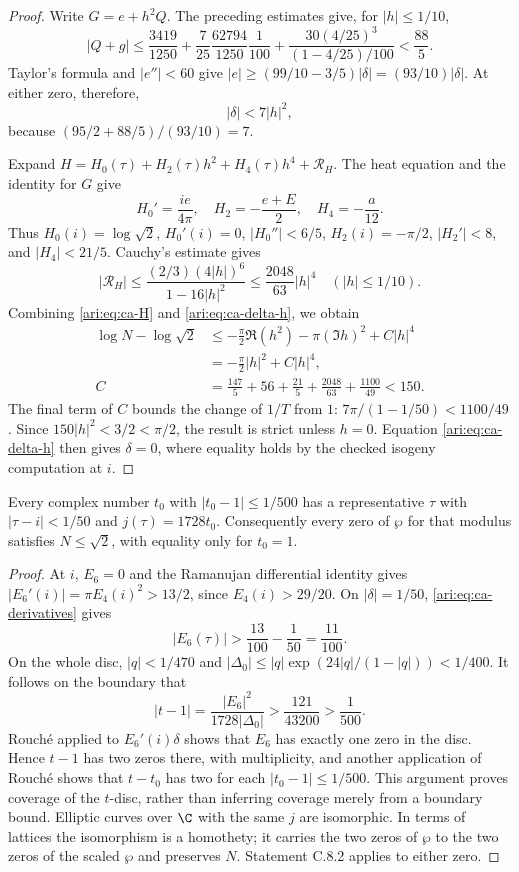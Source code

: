 \begin{proof}
Write $G=e+h^2Q$. The preceding estimates give, for $|h|\le1/10$,
\[
 |Q+g|\le
 \frac{3419}{1250}+\frac7{25}\frac{62794}{1250}\frac1{100}
       +\frac{30(4/25)^3}{(1-4/25)/100}<\frac{88}{5}.
\]
Taylor's formula and $|e''|<60$ give
$|e|\ge(99/10-3/5)|\delta|=(93/10)|\delta|$.
At either zero, therefore,
\begin{equation}\label{ari:eq:ca-delta-h}
 |\delta|<7|h|^2,
\end{equation}
because $(95/2+88/5)/(93/10)=7$.

Expand
$H=H_0(\tau)+H_2(\tau)h^2+H_4(\tau)h^4+\mathcal R_H$.
The heat equation and the identity for $G$ give
\[
 H_0'=\frac{ie}{4\pi},\quad
 H_2=-\frac{e+E}{2},\quad H_4=-\frac a{12}.
\]
Thus $H_0(i)=\log\sqrt2$, $H_0'(i)=0$,
$|H_0''|<6/5$, $H_2(i)=-\pi/2$, $|H_2'|<8$, and
$|H_4|<21/5$. Cauchy's estimate gives
\[
 |\mathcal R_H|\le
 \frac{(2/3)(4|h|)^6}{1-16|h|^2}
 \le\frac{2048}{63}|h|^4
 \quad (|h|\le1/10).
\]
Combining \eqref{ari:eq:ca-H} and \eqref{ari:eq:ca-delta-h}, we obtain
\begin{align*}
 \log N-\log\sqrt2
 &\le-\frac\pi2\Re(h^2)-\pi(\Im h)^2+C|h|^4\\
 &=-\frac\pi2|h|^2+C|h|^4,\\
 C&=\frac{147}{5}+56+\frac{21}{5}
                 +\frac{2048}{63}+\frac{1100}{49}<150.
\end{align*}
The final term of $C$ bounds the change of $1/T$ from $1$:
$7\pi/(1-1/50)<1100/49$. Since $150|h|^2<3/2<\pi/2$,
the result is strict unless $h=0$. Equation
\eqref{ari:eq:ca-delta-h} then gives $\delta=0$, where equality
holds by the checked isogeny computation at $i$.
\end{proof}

\begin{proposition}\label{ari:C.8.3}
Every complex number $t_0$ with $|t_0-1|\le1/500$ has a
representative $\tau$ with $|\tau-i|<1/50$ and $j(\tau)=1728t_0$.
Consequently every zero of $\wp$ for that modulus satisfies
$N\le\sqrt2$, with equality only for $t_0=1$.
\end{proposition}
\begin{proof}
At $i$, $E_6=0$ and the Ramanujan differential identity gives
$|E_6'(i)|=\pi E_4(i)^2>13/2$, since $E_4(i)>29/20$.
On $|\delta|=1/50$, \eqref{ari:eq:ca-derivatives} gives
\[
 |E_6(\tau)|>\frac{13}{100}-\frac1{50}=\frac{11}{100}.
\]
On the whole disc, $|q|<1/470$ and
$|\Delta_0|\le |q|\exp(24|q|/(1-|q|))<1/400$.
It follows on the boundary that
\[
 |t-1|=\frac{|E_6|^2}{1728|\Delta_0|}
 >\frac{121}{43200}>\frac1{500}.
\]
Rouch\'e applied to $E_6'(i)\delta$ shows that $E_6$ has
exactly one zero in the disc. Hence $t-1$ has two zeros there,
with multiplicity, and another application of Rouch\'e shows
that $t-t_0$ has two for each $|t_0-1|\le1/500$.
This argument proves coverage of the $t$-disc, rather than
inferring coverage merely from a boundary bound. Elliptic
curves over $\C$ with the same $j$ are isomorphic. In terms of
lattices the isomorphism is a homothety; it carries the two
zeros of $\wp$ to the two zeros of the scaled $\wp$ and
preserves $N$. Statement C.8.2 applies to either zero.
\end{proof}


